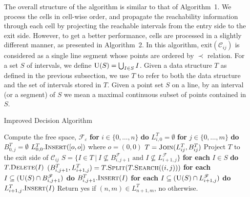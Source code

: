 \documentclass[12pt]{dalthesis}
\newcommand{\set}[1]{{\{ #1 \}}}
\newcommand{\eps}{\varepsilon}
\newcommand{\CF}{{\mathscr F}}
\newcommand{\CC}{{\mathscr C}}
\newcommand{\cell}[1]{{\CC_{#1}}}
\newcommand{\Feps}{\CF_\eps}
\newcommand{\LF}{L^\CF}
\newcommand{\BF}{B^\CF}
\newcommand{\LT}{L^{T}}
\newcommand{\BT}{B^{T}}
\newcommand{\exit}[1]{\mbox{exit}(\cell{#1})}
\newcommand{\union}{\mbox{\sc U}}
\newcommand{\lei}{\prec}
\newcommand{\For}{{\bf for }}
\newcommand{\Foreach}{{\bf for each }}
\newcommand{\Do}{{\bf do }}
\begin{document}
The overall structure of the algorithm is similar to that of Algorithm~1.
We process the cells in cell-wise order,
and propagate the reachability information through each cell
by projecting the reachable intervals from the entry side to the exit side.
However, to get a better performance, 
cells are processed in a slightly different manner, as presented in Algorithm~2.
In this algorithm, $\exit{ij}$ is considered
as a single line segment whose points are ordered by $\lei$ relation.
For a set $S$ of intervals, we define $\union(S) = \bigcup_{I \in S} I$.
Given a data structure $T$ as defined in the previous subsection,
we use $T$ to refer to both the data structure and the 
set of intervals stored in $T$.
Given a point set $S$ on a line, by an interval (or a segment) of $S$ we mean 
a maximal continuous subset of points contained in $S$.


\vspace{0.5em}
\begin{algorithm} [h]
\caption {\sc Improved Decision Algorithm} \label{alg:improved}
\begin{algorithmic}[1]
	\vspace{0.5em}
	\baselineskip

	\STATE\label{l:0} Compute the free space, $\Feps$
	\STATE\label{l:1} \For $i \in \set{0, \ldots, n}$ \Do $\LT_{i,0} = \emptyset$ \STATE\label{l:2} \For $j \in \set{0, \ldots, m}$ \Do $\BT_{0,j} = \emptyset$
	\STATE\label{l:3} $\LT_{0,0}.\mbox{\sc Insert}([o,o])$ where $o = (0,0)$
	 \label{l:loop}
			\STATE\label{l:cat} $T = \mbox{\sc Join}(\LT_{ij}, \BT_{ij})$  
			\STATE\label{l:cop} Project $T$ to the exit side of $\cell{ij}$
\STATE\label{l:s} $S = \set{I \in T \ | \ I \not\subseteq \BF_{i,j+1} \mbox{ and } I \not\subseteq  \LF_{i+1,j} }$
			\STATE\label{l:del} \Foreach $I \in S$ \Do $T.\mbox{\sc Delete}(I)$
			\STATE\label{l:spl} $(\BT_{i,j+1}, \LT_{i+1,j}) = T.\mbox{\sc Split}(T.\mbox{\sc Search}((i,j)))$
			\STATE\label{l:ins1} \Foreach $I \subseteq (\union(S) \cap \BF_{i,j+1})$ \Do $\BT_{i,j+1}.\mbox{\sc Insert}(I)$ 
			\STATE\label{l:ins2} \Foreach $I \subseteq (\union(S) \cap \LF_{i+1,j})$ \Do $\LT_{i+1,j}.\mbox{\sc Insert}(I)$ 
		\ENDFOR
	\ENDFOR
	\STATE\label{l:last} Return {\sc yes} if $(n,m) \in \LT_{n+1,m}$, {\sc no} otherwise. 

\end{algorithmic}
\end{algorithm}
\vspace{0.5em}
\end{document}
